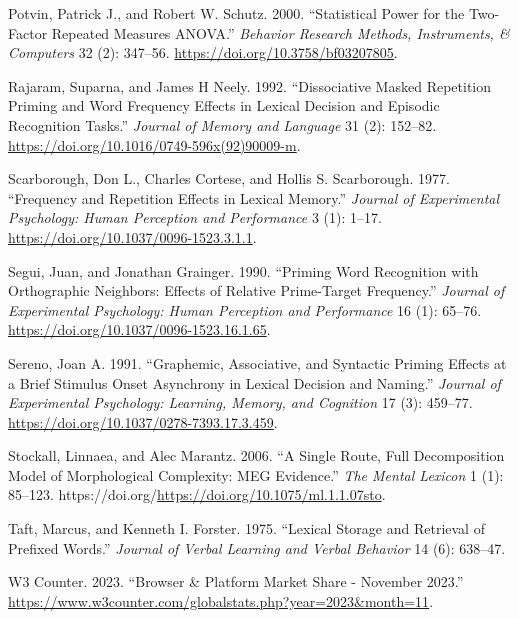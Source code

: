 \documentclass[
]{interact}
\newlength{\cslhangindent}
\newenvironment{CSLReferences}[2] %
 {\begin{list}{}{%
  \setlength{\itemindent}{0pt}
  \setlength{\leftmargin}{0pt}
  \setlength{\parsep}{0pt}
  \ifodd #1
   \setlength{\leftmargin}{\cslhangindent}
   \setlength{\itemindent}{-1\cslhangindent}
  \fi
  \setlength{\itemsep}{#2\baselineskip}}}
 {\end{list}}
\begin{document}
\begin{CSLReferences}{1}{0}
Potvin, Patrick J., and Robert W. Schutz. 2000. {``Statistical Power for
the Two-Factor Repeated Measures ANOVA.''} \emph{Behavior Research
Methods, Instruments, \& Computers} 32 (2): 347--56.
\url{https://doi.org/10.3758/bf03207805}.

Rajaram, Suparna, and James H Neely. 1992. {``Dissociative Masked
Repetition Priming and Word Frequency Effects in Lexical Decision and
Episodic Recognition Tasks.''} \emph{Journal of Memory and Language} 31
(2): 152--82. \url{https://doi.org/10.1016/0749-596x(92)90009-m}.

Scarborough, Don L., Charles Cortese, and Hollis S. Scarborough. 1977.
{``Frequency and Repetition Effects in Lexical Memory.''} \emph{Journal
of Experimental Psychology: Human Perception and Performance} 3 (1):
1--17. \url{https://doi.org/10.1037/0096-1523.3.1.1}.

Segui, Juan, and Jonathan Grainger. 1990. {``Priming Word Recognition
with Orthographic Neighbors: Effects of Relative Prime-Target
Frequency.''} \emph{Journal of Experimental Psychology: Human Perception
and Performance} 16 (1): 65--76.
\url{https://doi.org/10.1037/0096-1523.16.1.65}.

Sereno, Joan A. 1991. {``Graphemic, Associative, and Syntactic Priming
Effects at a Brief Stimulus Onset Asynchrony in Lexical Decision and
Naming.''} \emph{Journal of Experimental Psychology: Learning, Memory,
and Cognition} 17 (3): 459--77.
\url{https://doi.org/10.1037/0278-7393.17.3.459}.

Stockall, Linnaea, and Alec Marantz. 2006. {``A Single Route, Full
Decomposition Model of Morphological Complexity: MEG Evidence.''}
\emph{The Mental Lexicon} 1 (1): 85--123.
https://doi.org/\url{https://doi.org/10.1075/ml.1.1.07sto}.

Taft, Marcus, and Kenneth I. Forster. 1975. {``Lexical Storage and
Retrieval of Prefixed Words.''} \emph{Journal of Verbal Learning and
Verbal Behavior} 14 (6): 638--47.

W3 Counter. 2023. {``Browser \& Platform Market Share - November
2023.''}
\url{https://www.w3counter.com/globalstats.php?year=2023&month=11}.


\end{CSLReferences}
\end{document}
